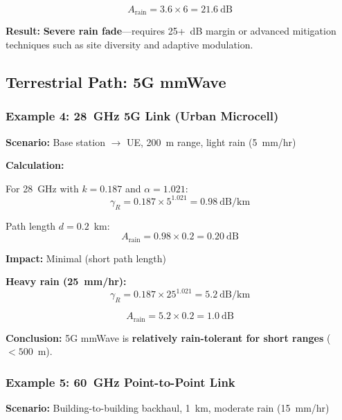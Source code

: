 \begin{equation}
A_{\text{rain}} = 3.6 \times 6 = 21.6~\text{dB}
\end{equation}

\textbf{Result:} \textbf{Severe rain fade}---requires 25+~dB margin or advanced mitigation techniques such as site diversity and adaptive modulation.

\subsection{Terrestrial Path: 5G mmWave}

\subsubsection{Example 4: 28~GHz 5G Link (Urban Microcell)}

\textbf{Scenario:} Base station $\rightarrow$ UE, 200~m range, light rain (5~mm/hr)

\textbf{Calculation:}

For 28~GHz with $k = 0.187$ and $\alpha = 1.021$:
\begin{equation}
\gamma_R = 0.187 \times 5^{1.021} = 0.98~\text{dB/km}
\end{equation}

Path length $d = 0.2$~km:
\begin{equation}
A_{\text{rain}} = 0.98 \times 0.2 = 0.20~\text{dB}
\end{equation}

\textbf{Impact:} Minimal (short path length)

\textbf{Heavy rain (25~mm/hr):}
\begin{equation}
\gamma_R = 0.187 \times 25^{1.021} = 5.2~\text{dB/km}
\end{equation}

\begin{equation}
A_{\text{rain}} = 5.2 \times 0.2 = 1.0~\text{dB}
\end{equation}

\textbf{Conclusion:} 5G mmWave is \textbf{relatively rain-tolerant for short ranges} ($< 500$~m).

\subsubsection{Example 5: 60~GHz Point-to-Point Link}

\textbf{Scenario:} Building-to-building backhaul, 1~km, moderate rain (15~mm/hr)

